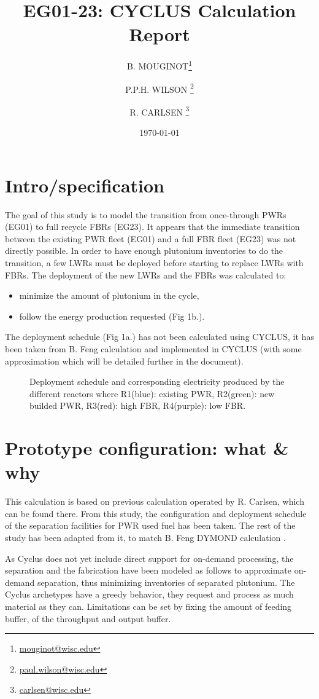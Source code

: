 \documentclass[12pt]{article}
\title{EG01-23: CYCLUS Calculation Report}
\author[1]{B. MOUGINOT\thanks{\href{mailto:mouginot@wisc.edu}{mouginot@wisc.edu}}}
\author[1]{P.P.H. WILSON \thanks{\href{mailto:paul.wilson@wisc.edu}{paul.wilson@wisc.edu}}}
\author[1]{R. CARLSEN \thanks{\href{mailto:carlsen@wisc.edu}{carlsen@wisc.edu}}}
\affil[1]{University of Wisconsin-Madison, Department of Engineering Physics, CNERG group}
\date{\today}
\begin{document}
\maketitle

\section{Intro/specification}
The goal of this study is to model the transition
from once-through PWRs (EG01) to full recycle FBRs
(EG23). It appears that the immediate transition
between the existing PWR fleet (EG01) and a full
FBR fleet (EG23) was not directly possible. In
order to have enough plutonium inventories to do
the transition, a few LWRs must be deployed before
starting to replace LWRs with FBRs. The deployment
of the new LWRs and the FBRs was calculated to:
\begin{itemize}
\item minimize the amount of plutonium in the cycle,
\item follow the energy production requested (Fig 1b.).
\end{itemize}
The deployment schedule (Fig 1a.) has not been
calculated using CYCLUS, it has been taken from B.
Feng calculation and implemented in CYCLUS (with
some approximation which will be detailed further
in the document).

\begin{figure}[h!]
\centering
{}
\caption{Deployment schedule and corresponding electricity produced by the different reactors where
R1(blue): existing PWR, R2(green): new builded PWR, R3(red): high FBR, R4(purple): low FBR.\label{fig:deployment} }
\end{figure}


\pagebreak
\section{Prototype configuration: what \& why}
This calculation is based on previous calculation
operated by R. Carlsen, which can be found there.
From this study, the configuration and deployment
schedule of the separation facilities for PWR used
fuel has been taken. The rest of the study has
been adapted from it, to match B. Feng DYMOND
calculation \cite{B.Feng_calculation}.

As Cyclus does not yet include direct support for
on-demand processing, the separation and the
fabrication have been modeled as follows to
approximate on-demand separation, thus minimizing
inventories of separated plutonium.
The Cyclus archetypes have a greedy behavior, they
request and process as much material as they can.
Limitations can be set by fixing the amount of
feeding buffer, of the throughput and output
buffer.
\end{document}
